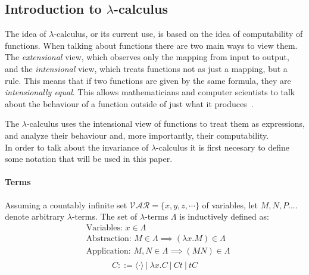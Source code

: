 \message{ !name(VU-CS-BSc-thesis-template.tex)}\documentclass[11pt]{article}
\begin{document}
  \subsection{Introduction to $\lambda$-calculus}\label{intro-lambda}
The idea of $\lambda$-calculus, or its current use, is based on the idea of computability of functions. When talking about functions there are two main ways to view them. The \textit{extensional} view, which observes only the mapping from input to output, and the \textit{intensional} view, which treats functions not as just a mapping, but a rule. This means that if two functions are given by the same formula, they are \textit{intensionally equal}. This allows mathematicians and computer scientists to talk about the behaviour of a function outside of just what it produces~\cite{selinger}.

The $\lambda$-calculus uses the intensional view of functions to treat them as expressions, and analyze their behaviour and, more importantly, their computability. \\
In order to talk about the invariance of $\lambda$-calculus it is first necesary to define some notation that will be used in this paper.
\paragraph{Terms} Assuming a countably infinite set $\mathcal{VAR} = \{ x, y, z, \cdots \}$ of variables, let $M, N, P....$ denote arbitrary $\lambda$-terms. The set of $\lambda$-terms $\Lambda$ is inductively defined as:
\begin{equation*}
  \begin{split}
  & \text{Variables: } x \in \Lambda \\
  & \text{Abstraction: } M \in \Lambda \implies ( \lambda x.M ) \in \Lambda \\
  & \text{Application: } M, N \in \Lambda \implies (M N) \in \Lambda \\
  \end{split}
\end{equation*}
\begin{equation*}
C ::= \langle \cdot \rangle \ | \ \lambda x.C \ | \ Ct \ | \ tC
\end{equation*}
\end{document}

